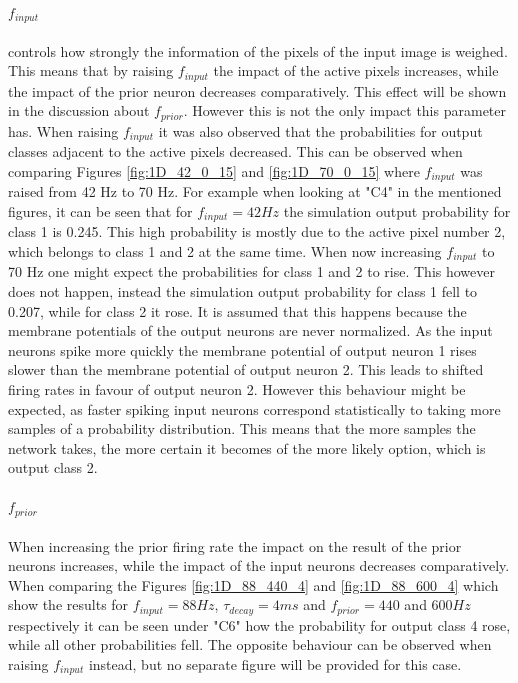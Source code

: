 \paragraph{$f_{input}$} controls how strongly the information of the pixels of the input image is weighed. This means that by raising $f_{input}$ the impact of the active pixels increases, while the impact of the prior neuron decreases comparatively. This effect will be shown in the discussion about $f_{prior}$. However this is not the only impact this parameter has. When raising $f_{input}$ it was also observed that the probabilities for output classes adjacent to the active pixels decreased. This can be observed when comparing Figures \ref{fig:1D_42_0_15} and \ref{fig:1D_70_0_15} where $f_{input}$ was raised from 42 Hz to 70 Hz. For example when looking at "C4" in the mentioned figures, it can be seen that for $f_{input} = 42 Hz$ the simulation output probability for class 1 is 0.245. This high probability is mostly due to the active pixel number 2, which belongs to class 1 and 2 at the same time. When now increasing $f_{input}$ to 70 Hz one might expect the probabilities for class 1 and 2 to rise. This however does not happen, instead the simulation output probability for class 1 fell to 0.207, while for class 2 it rose.
It is assumed that this happens because the membrane potentials of the output neurons are never normalized. As the input neurons spike more quickly the membrane potential of output neuron 1 rises slower than the membrane potential of output neuron 2. This leads to shifted firing rates in favour of output neuron 2. However this behaviour might be expected, as faster spiking input neurons correspond statistically to taking more samples of a probability distribution. This means that the more samples the network takes, the more certain it becomes of the more likely option, which is output class 2.

\paragraph{$f_{prior}$} When increasing the prior firing rate the impact on the result of the prior neurons increases, while the impact of the input neurons decreases comparatively. When comparing the Figures \ref{fig:1D_88_440_4} and \ref{fig:1D_88_600_4} which show the results for $f_{input} = 88 Hz$, $\tau_{decay} = 4 ms$ and $f_{prior} = 440$ and $600 Hz$ respectively it can be seen under "C6" how the probability for output class 4 rose, while all other probabilities fell. The opposite behaviour can be observed when raising $f_{input}$ instead, but no separate figure will be provided for this case.

